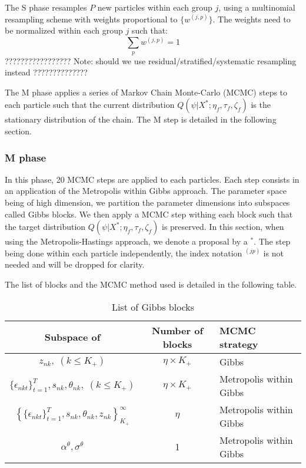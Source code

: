 \documentclass[12pt]{article}
\begin{document}
The S phase resamples $P$ new particles within each group $j$, using a multinomial resampling scheme with weights proportional to $\{ w^{(j,p)}\}$. The weights need to be normalized within each group $j$ such that:
$$ \sum_p  w^{(j,p)} = 1 $$ 
????????????????? Note: should we use residual/stratified/systematic resampling instead ??????????????

The M phase applies a series of Markov Chain Monte-Carlo (MCMC) steps to each particle such that the current distribution $Q(\psi|X^*;\eta_f,\tau_f,\zeta_f)$ is the stationary distribution of the chain. The M step is detailed in the following section.

\subsubsection{M phase}

In this phase, 20 MCMC steps are applied to each particles. Each step consists in an application of the Metropolis within Gibbs approach. The parameter space being of high dimension, we partition the parameter dimensions into subspaces called Gibbs blocks. We then apply a MCMC step withing each block such that the target distribution $Q(\psi|X^*;\eta_f,\tau_f,\zeta_f)$ is preserved. In this section, when using the Metropolis-Hastings approach, we denote a proposal by a ${}^*$. The step being done within each particle independently, the index notation ${}^{(jp)}$ is not needed and will be dropped for clarity.

The list of blocks and the MCMC method used is detailed in the following table.

\begin{table}[H]
	\centering
	\caption{List of Gibbs blocks}
	\label{tab:gibbsblocks}
	\bgroup
		\def\arraystretch{2}
		\begin{tabular}{|c|c|l|}
			\hline
			Subspace of  & Number of blocks & MCMC strategy \\ \hline
			$z_{nk}, \;(k \leq K_+)$ & $\eta \times K_+$ & Gibbs \\ \hline
			$\{\epsilon_{nkt}\}_{t=1}^T, s_{nk}, \theta_{nk}, \;(k \leq K_+)$ & $\eta \times K_+$ & Metropolis within Gibbs \\ \hline
			$\left\{ \{\epsilon_{nkt}\}_{t=1}^T, s_{nk}, \theta_{nk},z_{nk} \right\}_{K_+}^{\infty}$  & $\eta$ & Metropolis within Gibbs \footnotemark \\ \hline
			
			$\alpha^\theta, \sigma^\theta$ & 1 &  Metropolis within Gibbs \\
			\hline
		\end{tabular}
	\egroup
\end{table} 
\end{document}
